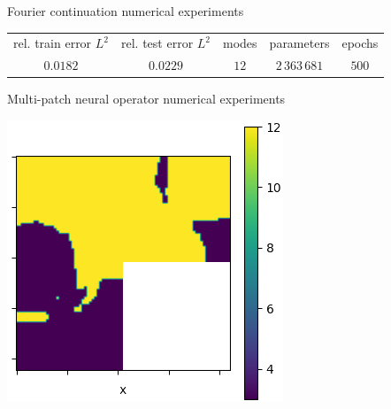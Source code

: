\documentclass{beamer}
\begin{document}
\begin{frame}{Fourier continuation numerical experiments}
\begin{center}
\begin{minipage}{0.24\textwidth}
		\end{minipage}
	\end{center}
	\begin{table}[h!] %
		\centering
		\begin{tabular}{ccccc}\toprule
			rel. train error $ L^2 $ & rel. test error $L^2$ & modes & parameters        & epochs \\
			\cmidrule{1-5}
			$ 0.0182 $               & $0.0229$              & $12$  & $ 2\, 363\, 681 $ & $500$  \\
			\bottomrule
		\end{tabular}
	\end{table}
\end{frame}


\begin{frame}{Multi-patch neural operator numerical experiments}
	\begin{center}
		\begin{minipage}{0.24\textwidth}
			\includegraphics[width=\textwidth]{MPNO_input.png}
		\end{minipage}
		\hfill
		\begin{minipage}{0.24\textwidth}

\end{minipage}
\end{center}
\end{frame}
\end{document}
